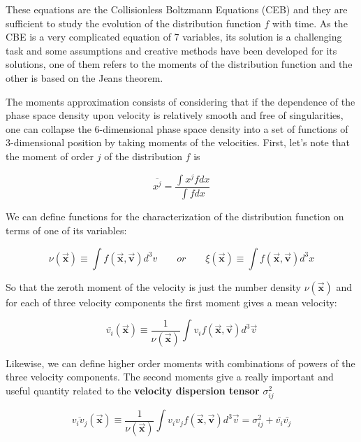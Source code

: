 These equations are the Collisionless Boltzmann Equations (CEB) and they are sufficient to study the evolution of the distribution function $f$ with time. As the CBE is a very complicated equation of 7 variables, its solution is a challenging task and some assumptions and creative methods have been developed for its solutions, one of them refers to the moments of the distribution function and the other is based on the Jeans theorem.

The moments approximation consists of considering that if the dependence of the phase space density upon velocity is relatively smooth and free of singularities, one can collapse the 6-dimensional phase space density into a set of functions of 3-dimensional position by taking moments of the velocities. First, let's note that the moment of order $j$ of the distribution $f$ is

\begin{equation}
\overline{x^{j}}=\frac {\int x^{j}fdx}{\int fdx}
\end{equation}

We can define functions for the characterization of the distribution function on terms of one of its variables:

\begin{equation}
\nu(\vec{\textbf{x}})\equiv \int f(\vec{\textbf{x}},\vec{\textbf{v}})d^{3}v\quad\quad or \quad\quad  \xi(\vec{\textbf{x}})\equiv \int f(\vec{\textbf{x}},\vec{\textbf{v}})d^{3}x
\end{equation}

So that the zeroth moment of the velocity is just the number density $\nu(\vec{\textbf{x}})$ and for each of three velocity components the first moment gives a mean velocity:

\begin{equation}
\bar{v_{i}}(\vec{\textbf{x}})\equiv \frac{1}{\nu(\vec{\textbf{x}})}\int v_{i}f(\vec{\textbf{x}},\vec{\textbf{v}})d^{3}\vec{v}
\end{equation}

Likewise, we can define higher order moments with combinations of powers of the three velocity components. The second moments give a really important and useful quantity related to the \textbf{velocity dispersion tensor} $\sigma^{2}_{ij}$

\begin{equation}
\overline{v_{i}v_{j}}(\vec{\textbf{x}})\equiv \frac{1}{\nu(\vec{\textbf{x}})}\int v_{i}v_{j}f(\vec{\textbf{x}},\vec{\textbf{v}})d^{3}\vec{v}=\sigma^{2}
_{ij}+\bar{v_{i}}\bar{v_{j}}
\end{equation}

